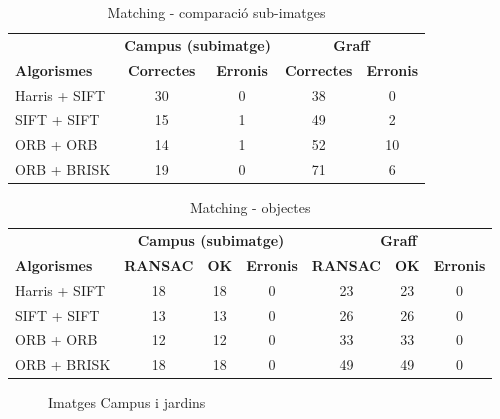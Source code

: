 		\begin{table}[H]
			\begin{center}
				\begin{tabular}{l | c c | c c}
					& \multicolumn{2}{c|}{\textbf{Campus (subimatge)}} & \multicolumn{2}{c}{\textbf{Graff}} \\
					\textbf{Algorismes} & \textbf{Correctes} & \textbf{Erronis} & \textbf{Correctes} & \textbf{Erronis} \\ \hline
					Harris + SIFT & 30 & 0 & 38 & 0 \\
					SIFT + SIFT & 15 & 1 & 49 & 2 \\
					ORB + ORB & 14 & 1 & 52 & 10 \\
					ORB + BRISK & 19 & 0 & 71 & 6 \\
				\end{tabular}
			\end{center}
			\caption{Matching - comparació sub-imatges}
		\end{table}

		\begin{table}[H]
			\begin{center}
				\begin{tabular}{l | c c c | c c c}
					& \multicolumn{3}{c|}{\textbf{Campus (subimatge)}} & \multicolumn{3}{c}{\textbf{Graff}} \\
					\textbf{Algorismes} & \textbf{RANSAC} & \textbf{OK} & \textbf{Erronis} & \textbf{RANSAC} & \textbf{OK} & \textbf{Erronis} \\ \hline
					Harris + SIFT & 18 & 18 & 0 & 23 & 23 & 0 \\
					SIFT + SIFT & 13 & 13 & 0 & 26 & 26 & 0 \\
					ORB + ORB & 12 & 12 & 0 & 33 & 33 & 0 \\
					ORB + BRISK & 18 & 18 & 0 & 49 & 49 & 0 \\
				\end{tabular}
			\end{center}
			\caption{Matching - objectes}
		\end{table}
		\noindent


		\begin{figure}[!htb]
			\caption{Imatges Campus i jardins}
		\end{figure}

